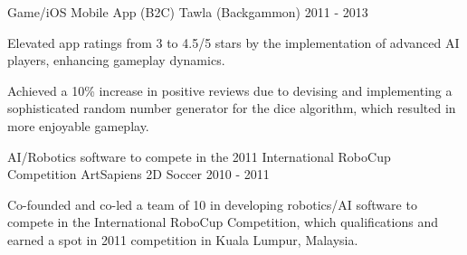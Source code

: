 \begin{cventries}
  \cventry
    {Game/iOS Mobile App (B2C)} %
    {Tawla (Backgammon)} %
    {2011 - 2013} %
    {} %
    {
          \begin{cvitems} %
	          	\item {Elevated app ratings from 3 to 4.5/5 stars by the implementation of advanced AI players, enhancing gameplay dynamics.}
				\item {Achieved a 10\% increase in positive reviews due to devising and implementing a sophisticated random number generator for the dice algorithm, which resulted in more enjoyable gameplay.}
	      \end{cvitems}
    }
    
    



  \cventry
    {AI/Robotics software to compete in the 2011 International RoboCup Competition} %
    {ArtSapiens 2D Soccer} %
    {2010 - 2011} %
    {} %
    {
          \begin{cvitems} %
			\item {Co-founded and co-led a team of 10 in developing robotics/AI software to compete in the International RoboCup Competition, which qualifications and earned a spot in 2011 competition in Kuala Lumpur, Malaysia.}
	      \end{cvitems}
    }
    
    

\end{cventries}
